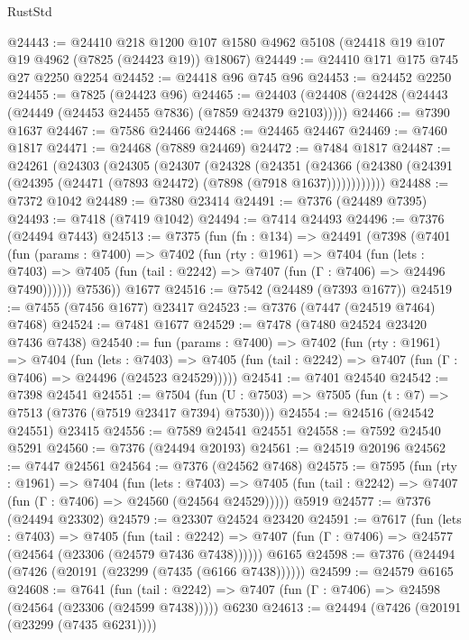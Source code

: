 \begin{lexlean}{RustStd}
\begin{coremodule}
@24443 := @24410
    @218
    @1200
    @107
    @1580
    @4962
    @5108
    (@24418 @19 @107 @19 @4962 (@7825 (@24423 @19)) @18067)
@24449 := @24410 @171 @175 @745 @27 @2250 @2254
@24452 := @24418 @96 @745 @96
@24453 := @24452 @2250
@24455 := @7825 (@24423 @96)
@24465 := @24403 (@24408 (@24428 (@24443 (@24449 (@24453 @24455 @7836) (@7859 @24379 @2103)))))
@24466 := @7390 @1637
@24467 := @7586 @24466
@24468 := @24465 @24467
@24469 := @7460 @1817
@24471 := @24468 (@7889 @24469)
@24472 := @7484 @1817
@24487 := @24261
    (@24303
      (@24305
        (@24307
          (@24328
            (@24351
              (@24366 (@24380 (@24391 (@24395 (@24471 (@7893 @24472) (@7898 (@7918 @1637))))))))))))
@24488 := @7372 @1042
@24489 := @7380 @23414
@24491 := @7376 (@24489 @7395)
@24493 := @7418 (@7419 @1042)
@24494 := @7414 @24493
@24496 := @7376 (@24494 @7443)
@24513 := @7375
    (fun (fn : @134) =>
    @24491
      (@7398
        (@7401
          (fun (params : @7400) =>
          @7402
            (fun (rty : @1961) =>
            @7404
              (fun (lets : @7403) =>
              @7405 (fun (tail : @2242) => @7407 (fun (Γ : @7406) => @24496 @7490))))))
        @7536))
    @1677
@24516 := @7542 (@24489 (@7393 @1677))
@24519 := @7455 (@7456 @1677) @23417
@24523 := @7376 (@7447 (@24519 @7464) @7468)
@24524 := @7481 @1677
@24529 := @7478 (@7480 @24524 @23420 @7436 @7438)
@24540 := fun (params : @7400) =>
  @7402
    (fun (rty : @1961) =>
    @7404
      (fun (lets : @7403) =>
      @7405 (fun (tail : @2242) => @7407 (fun (Γ : @7406) => @24496 (@24523 @24529)))))
@24541 := @7401 @24540
@24542 := @7398 @24541
@24551 := @7504
    (fun (U : @7503) => @7505 (fun (t : @7) => @7513 (@7376 (@7519 @23417 @7394) @7530)))
@24554 := @24516 (@24542 @24551) @23415
@24556 := @7589 @24541 @24551
@24558 := @7592 @24540 @5291
@24560 := @7376 (@24494 @20193)
@24561 := @24519 @20196
@24562 := @7447 @24561
@24564 := @7376 (@24562 @7468)
@24575 := @7595
    (fun (rty : @1961) =>
    @7404
      (fun (lets : @7403) =>
      @7405 (fun (tail : @2242) => @7407 (fun (Γ : @7406) => @24560 (@24564 @24529)))))
    @5919
@24577 := @7376 (@24494 @23302)
@24579 := @23307 @24524 @23420
@24591 := @7617
    (fun (lets : @7403) =>
    @7405
      (fun (tail : @2242) =>
      @7407 (fun (Γ : @7406) => @24577 (@24564 (@23306 (@24579 @7436 @7438))))))
    @6165
@24598 := @7376 (@24494 (@7426 (@20191 (@23299 (@7435 (@6166 @7438))))))
@24599 := @24579 @6165
@24608 := @7641
    (fun (tail : @2242) => @7407 (fun (Γ : @7406) => @24598 (@24564 (@23306 (@24599 @7438)))))
    @6230
@24613 := @24494 (@7426 (@20191 (@23299 (@7435 @6231))))

\end{coremodule}
\end{lexlean}
